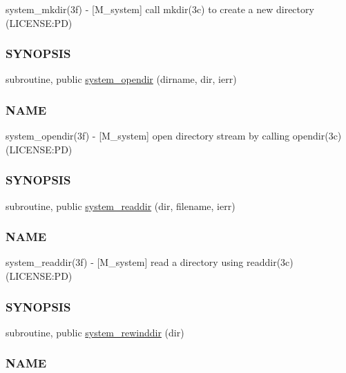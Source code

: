\begin{DoxyCompactItemize}
\begin{DoxyCompactList}
system\+\_\+mkdir(3f) -\/ \mbox{[}M\+\_\+system\mbox{]} call mkdir(3c) to create a new directory (L\+I\+C\+E\+N\+SE\+:PD) \subsubsection*{S\+Y\+N\+O\+P\+S\+IS}\end{DoxyCompactList}\item 
subroutine, public \mbox{\hyperlink{namespacem__system_a622cc67c03e8cdea1d4c2430bb36081b}{system\+\_\+opendir}} (dirname, dir, ierr)
\begin{DoxyCompactList}\small\item\em \subsubsection*{N\+A\+ME}

system\+\_\+opendir(3f) -\/ \mbox{[}M\+\_\+system\mbox{]} open directory stream by calling opendir(3c) (L\+I\+C\+E\+N\+SE\+:PD) \subsubsection*{S\+Y\+N\+O\+P\+S\+IS}\end{DoxyCompactList}\item 
subroutine, public \mbox{\hyperlink{namespacem__system_a983df5b2d7cb5842d69c4a31829403e0}{system\+\_\+readdir}} (dir, filename, ierr)
\begin{DoxyCompactList}\small\item\em \subsubsection*{N\+A\+ME}

system\+\_\+readdir(3f) -\/ \mbox{[}M\+\_\+system\mbox{]} read a directory using readdir(3c) (L\+I\+C\+E\+N\+SE\+:PD) \subsubsection*{S\+Y\+N\+O\+P\+S\+IS}\end{DoxyCompactList}\item 
subroutine, public \mbox{\hyperlink{namespacem__system_a3ffe757195ade8052e8acabd196ee3ca}{system\+\_\+rewinddir}} (dir)
\begin{DoxyCompactList}\small\item\em \subsubsection*{N\+A\+ME}


\end{DoxyCompactList}
\end{DoxyCompactItemize}
